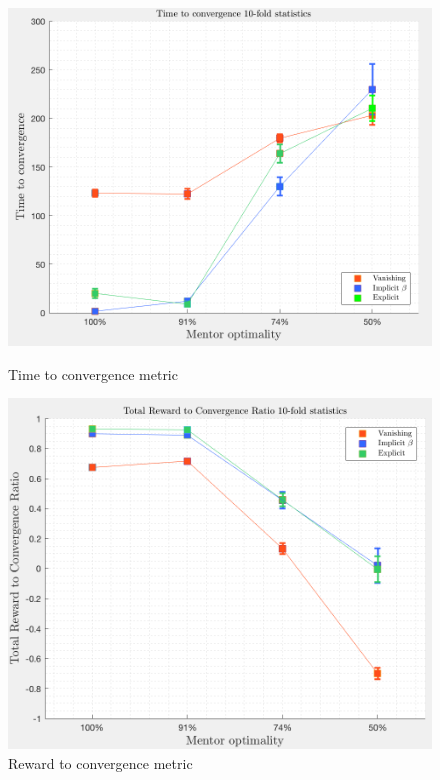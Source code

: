 \documentclass[a4paper]{report}
\begin{document}
{{{{				\begin{figure}[ht!]
					\begin{minipage}{0.5\linewidth}
						\includegraphics[width=\linewidth]{tt_metric}
						\caption{Time to convergence metric}
						\label{fig::metric_tt}
					\end{minipage}
					\begin{minipage}{0.5\linewidth}
						\includegraphics[width=\linewidth]{tr_metric}
						\caption{Reward to convergence metric}
						\label{fig::metric_tr}
					\end{minipage}
				\end{figure}	
			}
		}
}}
\end{document}

